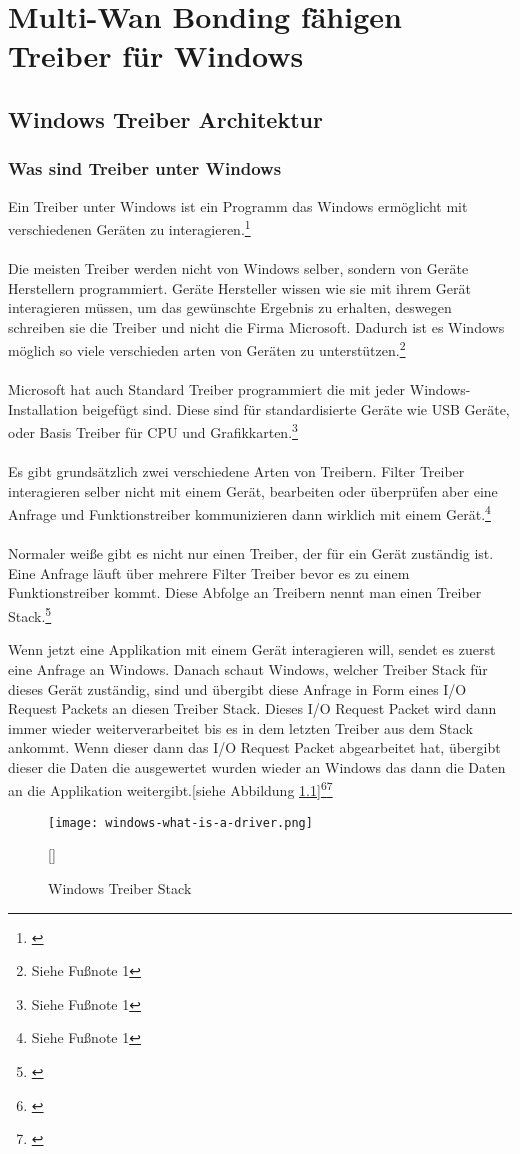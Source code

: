 \chapter{Multi-Wan Bonding fähigen Treiber für Windows}
\label{chap:Treiber}

\section{Windows Treiber Architektur}
\subsection{Was sind Treiber unter Windows}
Ein Treiber unter Windows ist ein Programm das Windows ermöglicht mit verschiedenen Geräten zu interagieren.\footnote[1]{\cite[Vgl.][]{21}}
\\\\
Die meisten Treiber werden nicht von Windows selber, sondern von Geräte Herstellern programmiert. Geräte Hersteller wissen wie sie mit ihrem Gerät interagieren müssen, um das gewünschte Ergebnis zu erhalten, deswegen schreiben sie die Treiber und nicht die Firma Microsoft. Dadurch ist es Windows möglich so viele verschieden arten von Geräten zu unterstützen.\footnote[2]{Siehe Fußnote 1}
\\\\
Microsoft hat auch Standard Treiber programmiert die mit jeder Windows-Installation beigefügt sind. Diese sind für standardisierte Geräte wie USB Geräte, oder Basis Treiber für CPU und Grafikkarten.\footnote[3]{Siehe Fußnote 1}
\\\\
Es gibt grundsätzlich zwei verschiedene Arten von Treibern. Filter Treiber interagieren selber nicht mit einem Gerät, bearbeiten oder überprüfen aber eine Anfrage und Funktionstreiber kommunizieren dann wirklich mit einem Gerät.\footnote[4]{Siehe Fußnote 1}
\\\\
Normaler weiße gibt es nicht nur einen Treiber, der für ein Gerät zuständig ist. Eine Anfrage läuft über mehrere Filter Treiber bevor es zu einem Funktionstreiber kommt. Diese Abfolge an Treibern nennt man einen Treiber Stack.\footnote[5]{\cite[Vgl.][]{19}}

\newpage

Wenn jetzt eine Applikation mit einem Gerät interagieren will, sendet es zuerst eine Anfrage an Windows. Danach schaut Windows, welcher Treiber Stack für dieses Gerät zuständig, sind und übergibt diese Anfrage in Form eines I/O Request Packets an diesen Treiber Stack. Dieses I/O Request Packet wird dann immer wieder weiterverarbeitet bis es in dem letzten Treiber aus dem Stack ankommt. Wenn dieser dann das I/O Request Packet abgearbeitet hat, übergibt dieser die Daten die ausgewertet wurden wieder an Windows das dann die Daten an die Applikation weitergibt.[siehe Abbildung \ref{windows-driver-stack}]\footnote[1]{\cite[Vgl.][]{19}}\footnote[2]{\cite[Vgl.][]{20}}
\begin{figure}[H]
    \centering
    \texttt{[image: windows-what-is-a-driver.png]}
    \caption[Windows Treiber Stack]{Windows Treiber Stack}[\cite{20}]
    \label{windows-driver-stack} 
\end{figure}
\noindent
